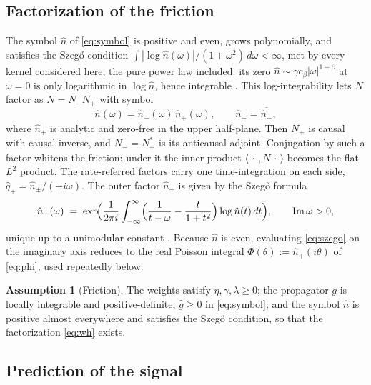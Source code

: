 \documentclass[11pt]{article}
\theoremstyle{plain}
\theoremstyle{definition}
\newtheorem{assumption}{Assumption}
\theoremstyle{remark}
\begin{document}
\subsection{Factorization of the friction}\label{sec:setup}

The symbol $\hat n$ of \eqref{eq:symbol} is positive and even, grows polynomially, and satisfies the Szeg\H{o} condition $\int|\log\hat n(\omega)|/(1+\omega^2)\,d\omega<\infty$, met by every kernel considered here, the pure power law included: its zero $\hat n\sim\gamma c_\beta|\omega|^{1+\beta}$ at $\omega=0$ is only logarithmic in $\log\hat n$, hence integrable \citep{Krein1962}. This log-integrability lets $N$ factor as $N=N_-N_+$ with symbol
\begin{equation}\label{eq:wh}
\hat n(\omega) = \hat n_-(\omega)\,\hat n_+(\omega), \qquad \hat n_- = \overline{\hat n_+},
\end{equation}
where $\hat n_+$ is analytic and zero-free in the upper half-plane. Then $N_+$ is causal with causal inverse, and $N_-=N_+^*$ is its anticausal adjoint. Conjugation by such a factor whitens the friction: under it the inner product $\langle\,\cdot\,,N\,\cdot\,\rangle$ becomes the flat $L^2$ product. The rate-referred factors carry one time-integration on each side, $\hat q_\pm=\hat n_\pm/(\mp i\omega)$. The outer factor $\hat n_+$ is given by the Szeg\H{o} formula
\begin{equation}\label{eq:szego}
\hat n_+(\omega) \;=\; \exp\!\Bigl(\frac{1}{2\pi i}\int_{-\infty}^{\infty}\Bigl(\frac{1}{t-\omega}-\frac{t}{1+t^2}\Bigr)\log \hat n(t)\,dt\Bigr), \qquad \operatorname{Im}\omega>0,
\end{equation}
unique up to a unimodular constant \citep{Krein1962}. Because $\hat n$ is even, evaluating \eqref{eq:szego} on the imaginary axis reduces to the real Poisson integral $\Phi(\theta):=\hat n_+(i\theta)$ of \eqref{eq:phi}, used repeatedly below.

\begin{assumption}[Friction]\label{ass:friction}
The weights satisfy $\eta,\gamma,\lambda\ge0$; the propagator $g$ is locally integrable and positive-definite, $\hat g\ge0$ in \eqref{eq:symbol}; and the symbol $\hat n$ is positive almost everywhere and satisfies the Szeg\H{o} condition, so that the factorization \eqref{eq:wh} exists.
\end{assumption}

\subsection{Prediction of the signal}\label{sec:meanrev}
\end{document}
